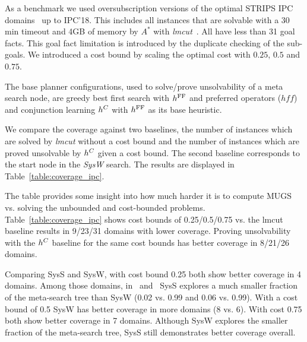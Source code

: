 
As a benchmark we used oversubscription versions of the optimal STRIPS IPC domains~ up to IPC'18. This includes all instances that are solvable with a 30 min timeout and 4GB of memory by $A^*$ with \emph{lmcut}~\cite{x}. All have less than 31 goal facts. This goal fact limitation is introduced by the duplicate checking of the sub-goals. We introduced a cost bound by scaling the optimal cost with $0.25$, $0.5$ and $0.75$.

The base planner configurations, used to solve/prove unsolvability of a meta search node,
are greedy best first search with $h^{\text{\textup{FF}}}$ and preferred operators ($hff$) and  
conjunction learning $h^C$ with $h^{\text{\textup{FF}}}$ as its base heuristic. 

We compare the coverage against two baselines, the number of instances which are solved by \emph{lmcut} without a cost bound and the number of instances which are proved unsolvable by $h^C$ given a cost bound. The second baseline corresponds to the start node in the \emph{SysW} search.
The results are displayed in Table~\ref{table:coverage_ipc}.

The table provides some insight into how much harder it is to compute MUGS vs. solving the unbounded and cost-bounded problems. Table~\ref{table:coverage_ipc} shows cost bounds of 0.25/0.5/0.75 vs. the lmcut baseline results in 9/23/31 domains with lower coverage.
Proving unsolvability with the $h^C$ baseline for the same cost bounds has better coverage in 8/21/26 domains.

Comparing SysS and SysW, with cost bound 0.25 both show better coverage in 4 domains. Among those domains, in \woodworking\ and \openstacks\ SysS explores a much smaller fraction of the meta-search tree than SysW (0.02 vs. 0.99 and 0.06 vs. 0.99). With a cost bound of 0.5 SysW has better coverage in more domains (8 vs. 6). With cost 0.75 both show better coverage in 7 domains. Although SysW explores the smaller fraction of the meta-search tree, SysS still demonstrates better coverage overall. 

